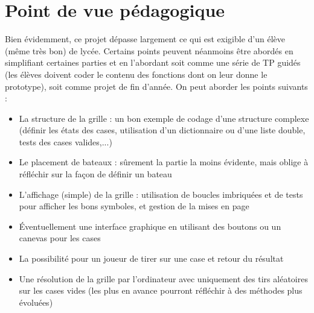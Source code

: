 \chapter{Point de vue pédagogique}

Bien évidemment, ce projet dépasse largement ce qui est exigible d'un élève (même très bon) de lycée. Certains points peuvent néanmoins être abordés en simplifiant certaines parties et en l'abordant soit comme une série de TP guidés (les élèves doivent coder le contenu des fonctions dont on leur donne le prototype), soit comme projet de fin d'année. On peut aborder les points suivants :
\begin{itemize}
\item La structure de la grille : un bon exemple de codage d'une structure complexe (définir les états des cases, utilisation d'un dictionnaire ou d'une liste double, tests des cases valides,...)
\item Le placement de bateaux : sûrement la partie la moins évidente, mais oblige à réfléchir sur la façon de définir un bateau 
\item L'affichage (simple) de la grille : utilisation de boucles imbriquées et de tests pour afficher les bons symboles, et gestion de la mises en page
\item Éventuellement une interface graphique en utilisant des boutons ou un canevas pour les cases
\item La possibilité pour un joueur de tirer sur une case et retour du résultat
\item Une résolution de la grille par l'ordinateur avec uniquement des tirs aléatoires sur les cases vides (les plus en avance pourront réfléchir à des méthodes plus évoluées)
\end{itemize}


